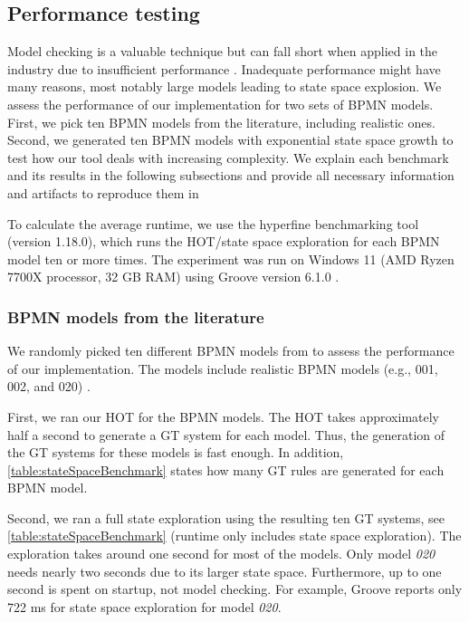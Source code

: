 \documentclass{lmcs} %
\begin{document}
\subsection{Performance testing} \label{subsec:performance}

Model checking is a valuable technique but can fall short when applied in the industry due to insufficient performance \cite{clarkeHandbookModelChecking2018}.
Inadequate performance might have many reasons, most notably large models leading to state space explosion.
We assess the performance of our implementation for two sets of BPMN models.
First, we pick ten BPMN models from the literature, including realistic ones.
Second, we generated ten BPMN models with exponential state space growth to test how our tool deals with increasing complexity.
We explain each benchmark and its results in the following subsections and provide all necessary information and artifacts to reproduce them in \cite{timkrauterLMCS2024Artifacts2023}

To calculate the average runtime, we use the hyperfine benchmarking tool \cite{peterHyperfine2023} (version 1.18.0), which runs the HOT/state space exploration for each BPMN model ten or more times.
The experiment was run on Windows 11 (AMD Ryzen 7700X processor, 32 GB RAM) using Groove version 6.1.0 \cite{timkrauterLMCS2024Artifacts2023}.

\subsubsection{BPMN models from the literature}

We randomly picked ten different BPMN models from \cite{houhouFirstOrderLogicVerification2022} to assess the performance of our implementation.
The models include realistic BPMN models (e.g., 001, 002, and 020) \cite{houhouFirstOrderLogicVerification2022}.

First, we ran our HOT for the BPMN models.
The HOT takes approximately half a second to generate a GT system for each model.
Thus, the generation of the GT systems for these models is fast enough.
In addition, \autoref{table:stateSpaceBenchmark} states how many GT rules are generated for each BPMN model. 

Second, we ran a full state exploration using the resulting ten GT systems, see \autoref{table:stateSpaceBenchmark} (runtime only includes state space exploration).
The exploration takes around one second for most of the models.
Only model \textit{020} needs nearly two seconds due to its larger state space.
Furthermore, up to one second is spent on startup, not model checking.
For example, Groove reports only 722 ms for state space exploration for model \textit{020}.
\end{document}
